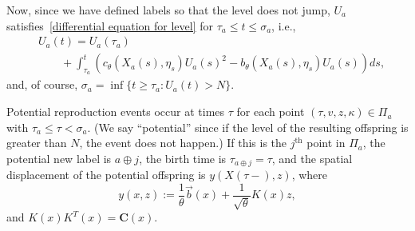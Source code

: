 \documentclass[12pt]{article}
\newcommand{\meanq}{\vec b}    %
\newcommand{\covq}{\mathbf{C}}     %
\newcommand{\concat}{\oplus}   %
\numberwithin{equation}{section}
\begin{document}
Now, since we have defined labels so that the level does not jump,
$U_a$ satisfies~\eqref{differential equation for level}
	for $\tau_a \le t \le \sigma_a$, i.e.,
\begin{equation} \label{eqn:U_line_of_descent}
    \begin{split}
& U_a(t)
    =
    U_a(\tau_a) \\
&\qquad {}   
    + \int_{\tau_a}^{t}
    \left(
        c_\theta(X_a(s),\eta_s) U_a(s)^2
        -
        b_\theta(X_a(s),\eta_s) U_a(s)
    \right)
    ds ,
\end{split}
\end{equation}
and, of course, $\sigma_a = \inf\{t \ge \tau_a : U_a(t) > N\}$.

Potential reproduction events occur at times $\tau$
for each point $(\tau, v, z, \kappa) \in \Pi_a$ with $\tau_a \le \tau < \sigma_a$.
(We say ``potential'' since if the level of the resulting offspring is greater than $N$,
the event does not happen.)
If this is the $j^\text{th}$ point in $\Pi_a$,
the potential new label is $a \concat j$, the birth time is $\tau_{a \concat j} = \tau$,
and the spatial displacement of the potential offspring is $y(X(\tau-), z)$, where
$$
    y(x, z)
    :=
    \frac{1}{\theta}\meanq(x)
    +
    \frac{1}{\sqrt{\theta}}K(x) z,
$$
and $K(x)K^{T}(x) = \covq(x)$.
\end{document}
